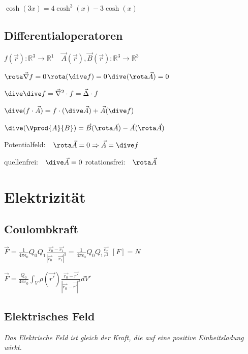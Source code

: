 \documentclass[10pt,a4paper]{scrartcl}
\begin{document}
\begin{multicols*}{3}
	$\cosh(3x)=4\cosh^3(x)-3\cosh(x)$
	\normalsize		
	
	\subsection{Differentialoperatoren}
	
	\begin{center}$f(\vec{r}):\mathbb{R}^3\longrightarrow\mathbb{R}^1\quad\vec{A}(\vec{r}),\vec{B}(\vec{r}):\mathbb{R}^3\longrightarrow\mathbb{R}^3$\end{center}
	
	\finn
	
	$\rota\vec{\nabla}f=0$\hfill$\rota(\dive f)=0 $\hfill$\dive(\rota\vec{A})=0$
	
	$\dive\dive f=\vec{\nabla}^2\cdot f=\vec{\Delta}\cdot f$
	
	$\dive(f\cdot\vec{A})=f\cdot(\dive\vec{A})+\vec{A}(\dive f)$
	
	$\dive(\Vprod{A}{B})=\vec{B}(\rota\vec{A})-\vec{A}(\rota\vec{A})$
	
	\finn
	
	Potentialfeld:$\quad\rota\vec{A}=0\Rightarrow\vec{A}=\dive f$ 
	
	quellenfrei:$\quad\dive\vec{A}=0$ \hfill rotationsfrei:$\quad\rota\vec{A}$
	
	\vfill
	
	\clearpage
	
	\section{Elektrizität}
	
	\subsection{Coulombkraft}
	
	$\vec{F} = \frac{1}{4\pi\epsilon_0}	Q_0Q_1	\frac{\vec{r_0}-\vec{r_1}}{|\vec{r_0}-\vec{r_1}|^3}	 =	\frac{1}{4\pi\epsilon_0}	Q_0Q_1	\frac{\vec{e_r}}{r^2}$ \hfill $[F]=N$
	
	$\vec{F}	=	\frac{Q_0}{4\pi\epsilon_0} \int_V{\rho(\vec{r'})	\frac{\vec{r_0}-\vec{r'}}{|\vec{r_0}-\vec{r'}|^3}dV'}$
	
	\subsection{Elektrisches Feld}
	
	\emph{Das Elektrische Feld ist gleich der Kraft, die auf eine positive Einheitsladung wirkt.} 
	

\end{multicols*}
\end{document}
